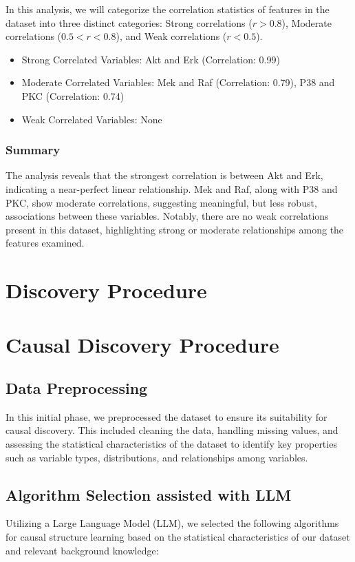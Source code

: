 \documentclass{article}
\begin{document}
In this analysis, we will categorize the correlation statistics of features in the dataset into three distinct categories: Strong correlations ($r > 0.8$), Moderate correlations ($0.5 < r < 0.8$), and Weak correlations ($r < 0.5$).

\begin{itemize}
    \item Strong Correlated Variables: Akt and Erk (Correlation: 0.99)
    \item Moderate Correlated Variables: Mek and Raf (Correlation: 0.79), P38 and PKC (Correlation: 0.74)
    \item Weak Correlated Variables: None
\end{itemize} 

\subsubsection{Summary}
The analysis reveals that the strongest correlation is between Akt and Erk, indicating a near-perfect linear relationship. Mek and Raf, along with P38 and PKC, show moderate correlations, suggesting meaningful, but less robust, associations between these variables. Notably, there are no weak correlations present in this dataset, highlighting strong or moderate relationships among the features examined.

\section{Discovery Procedure}
\section{Causal Discovery Procedure}

\subsection{Data Preprocessing}
In this initial phase, we preprocessed the dataset to ensure its suitability for causal discovery. This included cleaning the data, handling missing values, and assessing the statistical characteristics of the dataset to identify key properties such as variable types, distributions, and relationships among variables.

\subsection{Algorithm Selection assisted with LLM}
Utilizing a Large Language Model (LLM), we selected the following algorithms for causal structure learning based on the statistical characteristics of our dataset and relevant background knowledge:
\end{document}
